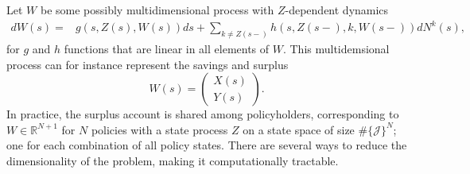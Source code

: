 \documentclass[12pt]{article}
\newcommand{\R}{\mathbb{R}}
\theoremstyle{my_thm}
\begin{document}
Let $W$ be some possibly multidimensional process with $Z$-dependent dynamics
\begin{align*}
dW(s)=& g(s,Z(s),W(s)) ds+ \sum_{k\neq Z(s-)} h(s,Z(s-),k,W(s-)) dN^k(s),
\end{align*}
for $g$ and $h$ functions that are linear in all elements of $W$. This multidemsional process can for instance represent the savings and surplus
$$
W(s)= \begin{pmatrix}
X(s)\\
Y(s)
\end{pmatrix}.
$$
In practice, the surplus account is shared among policyholders, corresponding to $W\in \R^{N+1}$ for $N$ policies with a state process $Z$ on a state space of size $\# \{ \mathcal{J} \}^N$; one for each combination of all policy states. There are several ways to reduce the dimensionality of the problem, making it computationally tractable.
\end{document}
